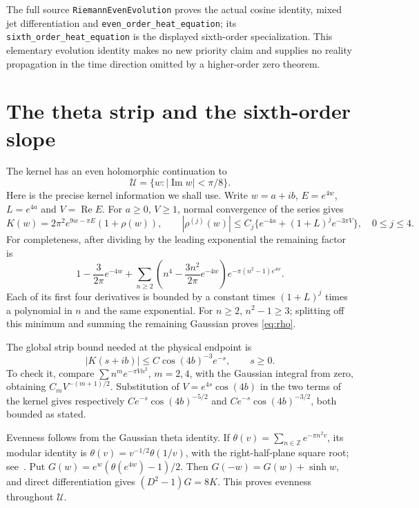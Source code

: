 \documentclass[11pt]{article}
\newcommand{\code}[1]{{\small\nolinkurl{#1}}}
\begin{document}
\par\noindent
The full source \code{RiemannEvenEvolution} proves the actual cosine
identity, mixed jet differentiation and
\code{even_order_heat_equation}; its
\code{sixth_order_heat_equation} is the displayed sixth-order
specialization. This elementary evolution identity makes no new
priority claim and supplies no reality propagation in the time
direction omitted by a higher-order zero theorem.

\section{The theta strip and the sixth-order slope}
The kernel has an even holomorphic continuation to
\[
 \mathcal U=\{w:|\operatorname{Im}w|<\pi/8\}.
\]
Here is the precise kernel information we shall use. Write
$w=a+ib$, $E=e^{4w}$, $L=e^{4a}$ and $V=\operatorname{Re}E$.
For $a\geq0$, $V\geq1$, normal convergence of the series gives
\begin{equation}\label{eq:rho}
 K(w)=2\pi^2e^{9w-\pi E}(1+\rho(w)),\qquad
 |\rho^{(j)}(w)|\leq C_j\{e^{-4a}+(1+L)^j e^{-3\pi V}\},
 \quad 0\leq j\leq4.
\end{equation}
For completeness, after dividing by the leading exponential
the remaining factor is
\[
 1-\frac{3}{2\pi}e^{-4w}
 +\sum_{n\geq2}\left(n^4-\frac{3n^2}{2\pi}e^{-4w}\right)
       e^{-\pi(n^2-1)e^{4w}}.
\]
Each of its first four derivatives is bounded by a constant
times $(1+L)^j$ times a polynomial in $n$ and the same
exponential. For $n\geq2$, $n^2-1\geq3$; splitting off this
minimum and summing the remaining Gaussian proves
\eqref{eq:rho}.

The global strip bound needed at the physical endpoint is
\begin{equation}\label{eq:stripbound}
 |K(s+ib)|\leq C\cos(4b)^{-3}e^{-s},\qquad s\geq0.
\end{equation}
To check it, compare $\sum n^m e^{-\pi Vn^2}$, $m=2,4$,
with the Gaussian integral from zero, obtaining
$C_m V^{-(m+1)/2}$. Substitution of $V=e^{4s}\cos(4b)$
in the two terms of the kernel gives respectively
$C e^{-s}\cos(4b)^{-5/2}$ and
$C e^{-s}\cos(4b)^{-3/2}$, both bounded as stated.

Evenness follows from the Gaussian theta identity. If
$\theta(v)=\sum_{n\in\mathbb Z}e^{-\pi n^2v}$, its modular
identity is $\theta(v)=v^{-1/2}\theta(1/v)$, with the
right-half-plane square root; see~\cite{dlmf}. Put
$G(w)=e^w(\theta(e^{4w})-1)/2$. Then
$G(-w)=G(w)+\sinh w$, and direct differentiation gives
$(D^2-1)G=8K$. This proves evenness throughout $\mathcal U$.
\end{document}
